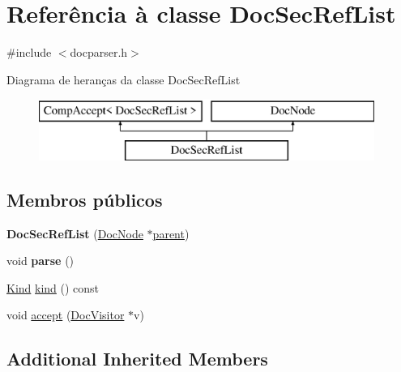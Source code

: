 \hypertarget{class_doc_sec_ref_list}{\section{Referência à classe Doc\-Sec\-Ref\-List}
\label{class_doc_sec_ref_list}
}


{\ttfamily \#include $<$docparser.\-h$>$}

Diagrama de heranças da classe Doc\-Sec\-Ref\-List\begin{figure}[H]
\begin{center}
\leavevmode
\includegraphics[height=2.000000cm]{class_doc_sec_ref_list}
\end{center}
\end{figure}
\subsection*{Membros públicos}
\begin{DoxyCompactItemize}
\item 
\hypertarget{class_doc_sec_ref_list_a3c0e466a77580fbc6dc736ad932e12cf}{{\bfseries Doc\-Sec\-Ref\-List} (\hyperlink{class_doc_node}{Doc\-Node} $\ast$\hyperlink{class_doc_node_abd7f070d6b0a38b4da71c2806578d19d}{parent})}\label{class_doc_sec_ref_list_a3c0e466a77580fbc6dc736ad932e12cf}

\item 
\hypertarget{class_doc_sec_ref_list_ad7c704b34912678d95c13243cacf9d7f}{void {\bfseries parse} ()}\label{class_doc_sec_ref_list_ad7c704b34912678d95c13243cacf9d7f}

\item 
\hyperlink{class_doc_node_aa10c9e8951b8ccf714a59ec321bdac5b}{Kind} \hyperlink{class_doc_sec_ref_list_aa9d037bed9f9a083d0cd01485637d843}{kind} () const 
\item 
void \hyperlink{class_doc_sec_ref_list_a7ba716e854ae2f8f87a4eb2140e302b6}{accept} (\hyperlink{class_doc_visitor}{Doc\-Visitor} $\ast$v)
\end{DoxyCompactItemize}
\subsection*{Additional Inherited Members}


